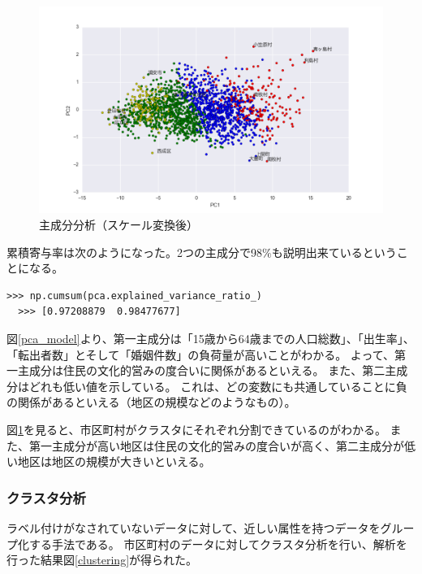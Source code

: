 \documentclass[a4paper,xelatex,ja=standard,jafont=hiragino-pron, 10pt]{bxjsarticle}
\begin{document}
\begin{figure}[ht]
  \centering
  \includegraphics[clip, width=15cm]{../data/picture/factor_log.png}
  \caption{主成分分析（スケール変換後）}
  \label{pca}
\end{figure}
\newpage
累積寄与率は次のようになった。2つの主成分で98$\%$も説明出来ているということになる。

\begin{lstlisting}[caption=累積寄与率, frame=single]
  >>> np.cumsum(pca.explained_variance_ratio_)
  >>> [0.97208879  0.98477677]
\end{lstlisting}

図\ref{pca_model}より、第一主成分は「15歳から64歳までの人口総数」、「出生率」、「転出者数」とそして「婚姻件数」の負荷量が高いことがわかる。
よって、第一主成分は住民の文化的営みの度合いに関係があるといえる。
また、第二主成分はどれも低い値を示している。
これは、どの変数にも共通していることに負の関係があるといえる（地区の規模などのようなもの）。

図\ref{pca}を見ると、市区町村がクラスタにそれぞれ分割できているのがわかる。
また、第一主成分が高い地区は住民の文化的営みの度合いが高く、第二主成分が低い地区は地区の規模が大きいといえる。

\subsubsection{クラスタ分析}

ラベル付けがなされていないデータに対して、近しい属性を持つデータをグループ化する手法である。
市区町村のデータに対してクラスタ分析を行い、解析を行った結果図\ref{clustering}が得られた。
\end{document}
